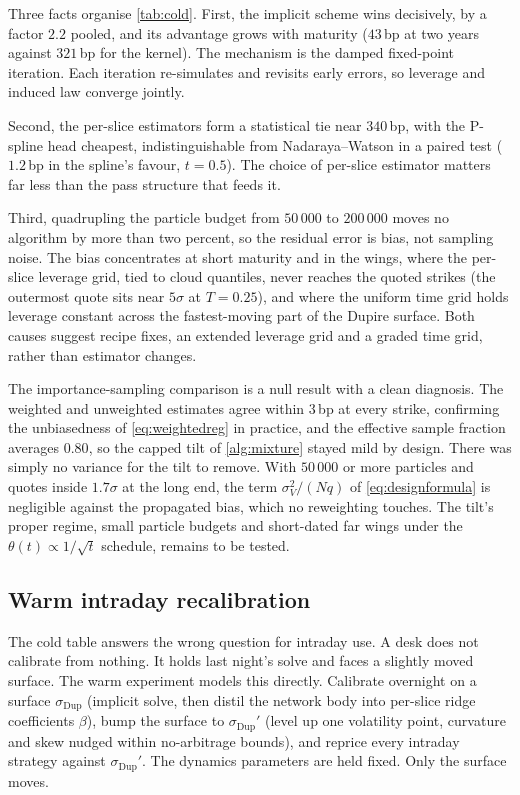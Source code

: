 \documentclass[11pt,a4paper]{article}
\theoremstyle{plain}
\theoremstyle{definition}
\theoremstyle{definition}
\newcommand{\sigDup}{\sigma_{\mathrm{Dup}}}
\begin{document}
Three facts organise \cref{tab:cold}. First, the implicit scheme wins decisively, by a factor $2.2$ pooled, and its advantage grows with maturity ($43$\,bp at two years against $321$\,bp for the kernel). The mechanism is the damped fixed-point iteration. Each iteration re-simulates and revisits early errors, so leverage and induced law converge jointly.

Second, the per-slice estimators form a statistical tie near $340$\,bp, with the P-spline head cheapest, indistinguishable from Nadaraya--Watson in a paired test ($1.2$\,bp in the spline's favour, $t = 0.5$). The choice of per-slice estimator matters far less than the pass structure that feeds it.

Third, quadrupling the particle budget from $50\,000$ to $200\,000$ moves no algorithm by more than two percent, so the residual error is bias, not sampling noise. The bias concentrates at short maturity and in the wings, where the per-slice leverage grid, tied to cloud quantiles, never reaches the quoted strikes (the outermost quote sits near $5\sigma$ at $T = 0.25$), and where the uniform time grid holds leverage constant across the fastest-moving part of the Dupire surface. Both causes suggest recipe fixes, an extended leverage grid and a graded time grid, rather than estimator changes.

The importance-sampling comparison is a null result with a clean diagnosis. The weighted and unweighted estimates agree within $3$\,bp at every strike, confirming the unbiasedness of \cref{eq:weightedreg} in practice, and the effective sample fraction averages $0.80$, so the capped tilt of \cref{alg:mixture} stayed mild by design. There was simply no variance for the tilt to remove. With $50\,000$ or more particles and quotes inside $1.7\sigma$ at the long end, the term $\sigma_V^2/(Nq)$ of \cref{eq:designformula} is negligible against the propagated bias, which no reweighting touches. The tilt's proper regime, small particle budgets and short-dated far wings under the $\theta(t) \propto 1/\sqrt{t}$ schedule, remains to be tested.

\subsection{Warm intraday recalibration}\label{subsec:warmresults}

The cold table answers the wrong question for intraday use. A desk does not calibrate from nothing. It holds last night's solve and faces a slightly moved surface. The warm experiment models this directly. Calibrate overnight on a surface $\sigDup$ (implicit solve, then distil the network body into per-slice ridge coefficients $\beta$), bump the surface to $\sigDup'$ (level up one volatility point, curvature and skew nudged within no-arbitrage bounds), and reprice every intraday strategy against $\sigDup'$. The dynamics parameters are held fixed. Only the surface moves.
\end{document}
